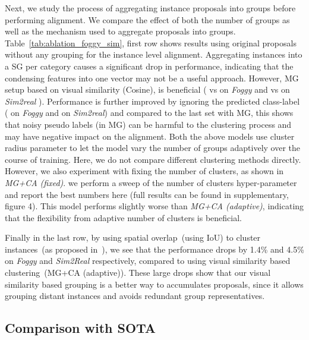 \documentclass[10pt,twocolumn,letterpaper]{article}
\begin{document}
 Next, we study the process of aggregating instance proposals into groups before performing alignment. We compare the effect of both the number of groups as well as the mechanism used to aggregate proposals into groups. Table~\ref{tab:ablation_foggy_sim}, 
first row shows results using original proposals without any grouping for the instance level alignment. 
Aggregating instances into a SG per category causes a significant drop in performance, indicating that the condensing features into one vector may not be a useful approach. 
However, MG setup based on visual similarity (Cosine), is beneficial ( vs  on \emph{Foggy} and  vs  on \emph{Sim2real} ).
Performance is further improved by ignoring the predicted class-label ( on \emph{Foggy} and  on \emph{Sim2real}) and compared to the last set with MG, this shows that noisy pseudo labels (in MG) can be harmful to the clustering process and may have negative impact on the alignment.
Both the above models use cluster radius parameter to let the model vary the number of groups adaptively over the course of training.
Here, we do not compare different clustering methods directly. However, we also experiment with fixing the number of clusters, as shown in \emph{MG+CA (fixed)}. we perform a sweep of the number of clusters hyper-parameter and report the best numbers here (full results can be found in supplementary, figure 4). 
This model performs slightly worse than \emph{MG+CA (adaptive)}, indicating that the flexibility from adaptive number of clusters is beneficial.

Finally in the last row, 
by using spatial overlap~(using IoU) to cluster instances~(as proposed in~\cite{GPA, zheng_cvpr20_prototype}), we see that the performance drops by 1.4\% and 4.5\% on \emph{Foggy} and \emph{Sim2Real} respectively, compared to using visual similarity based clustering~(MG+CA (adaptive)). These large drops show that our visual similarity based grouping is a better way to accumulates proposals, since it allows grouping distant instances and avoids redundant group representatives. 

\subsection{Comparison with SOTA}
\label{sec:comppriorwork}
\end{document}
